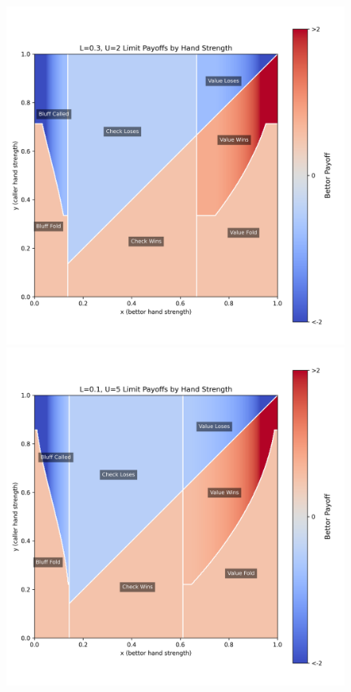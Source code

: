 \documentclass[a4paper,12pt]{article}
\theoremstyle{plain}
\theoremstyle{definition}
\begin{document}
\begin{figure}[h!]
\begin{adjustwidth}{-1in}{-1in}
\begin{minipage}{0.4\textwidth}
        \end{minipage}
        \vspace{-0.5cm}\\ %
        \begin{minipage}{0.4\textwidth}
            \centering
            \includegraphics[width=\textwidth]{LU_payoffs_0.3_2.png}
        \end{minipage}
        \hspace{0.02\textwidth}
        \begin{minipage}{0.4\textwidth}
            \centering
            \includegraphics[width=\textwidth]{LU_payoffs_0.1_5.png}

\end{minipage}
\end{adjustwidth}
\end{figure}
\end{document}
